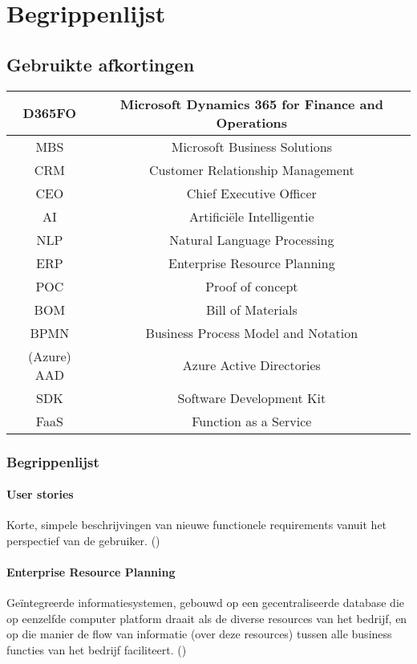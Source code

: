 \chapter{Begrippenlijst}
\label{ch:begrippenlijst}

\section{Gebruikte afkortingen}
\begin{tabular}{|c|c|}
    \hline 
    D365FO &  Microsoft Dynamics 365 for Finance and Operations \\
    \hline 
    MBS & Microsoft Business Solutions \\
    \hline
    CRM & Customer Relationship Management  \\
    \hline
    CEO & Chief Executive Officer \\
    \hline
    AI & Artificiële Intelligentie \\
    \hline
    NLP & Natural Language Processing \\
    \hline
    ERP & Enterprise Resource Planning \\
    \hline
    POC & Proof of concept \\
    \hline 
    BOM & Bill of Materials \\
    \hline 
    BPMN & Business Process Model and Notation \\
    \hline 
    (Azure) AAD & Azure Active Directories \\
    \hline 
    SDK & Software Development Kit \\
    \hline
    FaaS & Function as a Service \\
    \hline
\end{tabular} 

\subsection{Begrippenlijst}
\subsubsection{User stories}
Korte, simpele beschrijvingen van nieuwe functionele requirements vanuit het perspectief van de gebruiker. (\textcite{Cohn2004})

\subsubsection{Enterprise Resource Planning}
Geïntegreerde informatiesystemen, gebouwd op een gecentraliseerde database die op eenzelfde computer platform draait als de diverse resources van het bedrijf, en op die manier de flow van informatie (over deze resources) tussen alle business functies van het bedrijf faciliteert. (\textcite{McGraw-Hill2011})

